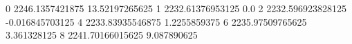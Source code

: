 0 2246.1357421875 13.52197265625
1 2232.61376953125 0.0
2 2232.596923828125 -0.016845703125
4 2233.83935546875 1.2255859375
6 2235.97509765625 3.361328125
8 2241.70166015625 9.087890625
